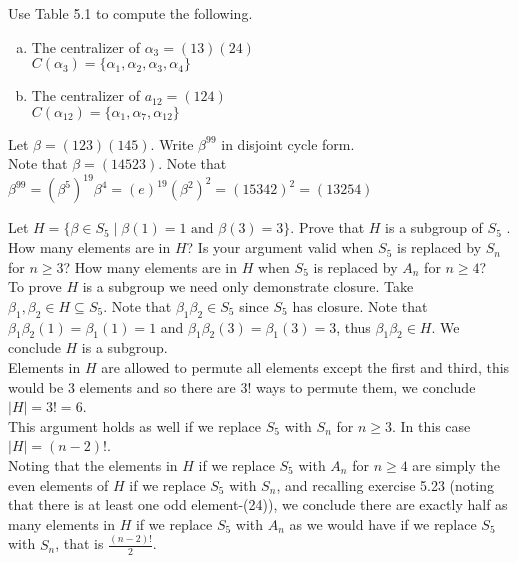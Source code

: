 \documentclass[12pt]{article}
\makeatletter
\theoremstyle{homework}
\newenvironment{exercise}[1]
{\def\@currentlabel{#1}\exercisecore}
{\endexercisecore}
\makeatother
\begin{document}
\begin{exercise}{5.27}
Use Table 5.1 to compute the following.
\begin{enumerate}[a.]
\item
The centralizer of $\alpha_3 = (13)(24)$\\
$C(\alpha_3)=\{\alpha_1,\alpha_2,\alpha_3,\alpha_4\}$
\item
The centralizer of $a_12 = (124)$\\
$C(\alpha_{12})=\{\alpha_1,\alpha_7,\alpha_{12}\}$
\end{enumerate}
\end{exercise}

\begin{exercise}{5.32}
Let $\beta= (123)(145)$. Write $\beta^{99}$ in disjoint cycle form.\\
Note that $\beta=(14523)$.  Note that $\beta^{99}=(\beta^5)^{19}\beta^4=(e)^{19}(\beta^2)^2=(15342)^2=(13254)$
\end{exercise}

\begin{exercise}{5.38}
Let $H = \{\beta \in S_5 \mid \beta(1) = 1 \text{ and } \beta(3) = 3\}$. Prove that $H$ is a subgroup of $S_5$ . How many elements are in $H$? Is your argument valid when $S_5$ is replaced by $S_n$ for $n \geq 3$? How many elements are in $H$ when $S_5$ is replaced by $A_n$ for $n \geq 4$?\\
To prove $H$ is a subgroup we need only demonstrate closure.  Take $\beta_1,\beta_2\in H\subseteq S_5$.  Note that $\beta_1\beta_2\in S_5$ since $S_5$ has closure.  Note that $\beta_1\beta_2(1)=\beta_1(1)=1$ and $\beta_1\beta_2(3)=\beta_1(3)=3$, thus $\beta_1\beta_2\in H$.  We conclude $H$ is a subgroup.\\
Elements in $H$ are allowed to permute all elements except the first and third, this would be $3$ elements and so there are $3!$ ways to permute them, we conclude $|H|=3!=6$.\\
This argument holds as well if we replace $S_5$ with $S_n$ for $n \geq 3$.  In this case $|H|=(n-2)!$.\\
Noting that the elements in $H$ if we replace $S_5$ with $A_n$ for $n \geq 4$ are simply the even elements of $H$ if we replace $S_5$ with $S_n$, and recalling exercise 5.23 (noting that there is at least one odd element-(24)), we conclude there are exactly half as many elements in $H$ if we replace $S_5$ with $A_n$ as we would have if we replace $S_5$ with $S_n$, that is $\frac{(n-2)!}{2}$.
\end{exercise}
\end{document}
